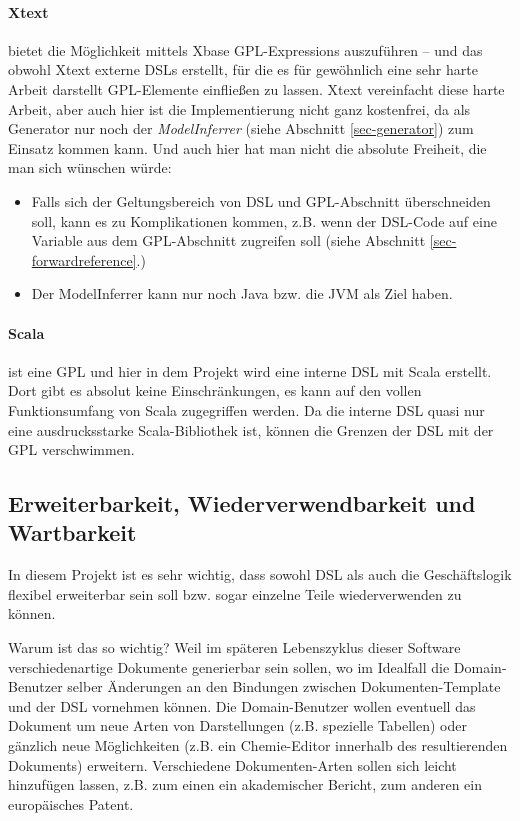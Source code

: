 \paragraph{Xtext} bietet die Möglichkeit mittels Xbase GPL-Expressions
auszuführen -- und das obwohl Xtext externe DSLs erstellt, für die es für
gewöhnlich eine sehr harte Arbeit darstellt GPL-Elemente einfließen zu lassen.
Xtext vereinfacht diese harte Arbeit, aber auch hier ist die Implementierung
nicht ganz kostenfrei, da als Generator nur noch der \emph{ModelInferrer}
(siehe Abschnitt \ref{sec-generator}) zum Einsatz kommen kann.
Und auch hier hat man nicht die absolute Freiheit, die man sich wünschen
würde:

\begin{itemize}
  \item Falls sich der Geltungsbereich von DSL und GPL-Abschnitt überschneiden
        soll, kann es zu Komplikationen kommen, z.B. wenn der DSL-Code
        auf eine Variable aus dem GPL-Abschnitt zugreifen soll (siehe
        Abschnitt \ref{sec-forwardreference}.)
  \item Der ModelInferrer kann nur noch Java bzw. die JVM als Ziel haben.
\end{itemize}

\paragraph{Scala} ist eine GPL und hier in dem Projekt wird eine interne
DSL mit Scala erstellt. Dort gibt es absolut keine Einschränkungen, es
kann auf den vollen Funktionsumfang von Scala zugegriffen werden.
Da die interne DSL quasi nur eine ausdrucksstarke Scala-Bibliothek ist,
können die Grenzen der DSL mit der GPL verschwimmen.


\subsection{Erweiterbarkeit, Wiederverwendbarkeit und Wartbarkeit}
\label{sec-erweiterbar}

In diesem Projekt ist es sehr wichtig, dass sowohl DSL als auch
die Geschäftslogik flexibel erweiterbar sein soll bzw. sogar
einzelne Teile wiederverwenden zu können.

Warum ist das so wichtig? Weil im späteren Lebenszyklus dieser Software
verschiedenartige Dokumente generierbar sein sollen, wo im Idealfall
die Domain-Benutzer selber Änderungen an den Bindungen zwischen
Dokumenten-Template und der DSL vornehmen können. Die Domain-Benutzer
wollen eventuell das Dokument um neue Arten von Darstellungen (z.B. spezielle
Tabellen) oder gänzlich neue Möglichkeiten (z.B. ein Chemie-Editor
innerhalb des resultierenden Dokuments) erweitern.
Verschiedene Dokumenten-Arten sollen sich leicht hinzufügen lassen,
z.B. zum einen ein akademischer Bericht, zum anderen ein europäisches Patent.

